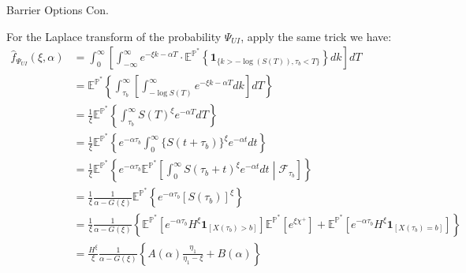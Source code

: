 \documentclass{beamer}
\begin{document}
\begin{frame}{Barrier Options Con.}

    {\footnotesize \scriptsize
    \par For the Laplace transform of the probability \(\Psi_{UI}\), apply the same trick we have: 
    \begin{align*}
        \hat{f}_{\Psi_{UI}}(\xi, \alpha) &= \int_0^\infty \left[ \int_{-\infty}^\infty e^{-\xi k - \alpha T} \cdot
         \mathbb{E}^{\mathbb{P}^*} \left\{ \mathbf{1}_{\{k > -\log(S(T)), \tau_b < T\}} \right\}  dk \right] dT\\
        &= \mathbb{E}^{\mathbb{P}^*} \left\{ \int_{\tau_b}^\infty \left[ \int_{-\log S(T)}^\infty e^{-\xi k - \alpha T}  dk \right] dT \right\}\\
        &= \frac{1}{\xi} \mathbb{E}^{\mathbb{P}^*} \left\{ \int_{\tau_b}^\infty S(T)^{\xi} e^{-\alpha T} dT \right\}\\
        &= \frac{1}{\xi} \mathbb{E}^{\mathbb{P}^*} \left\{ e^{-\alpha \tau_b} \int_0^\infty \{ S(t + \tau_b) \}^{\xi} e^{-\alpha t} dt \right\}\\
        &= \frac{1}{\xi} \mathbb{E}^{\mathbb{P}^*} \left\{ e^{-\alpha \tau_b} \mathbb{E}^{\mathbb{P}^*} \left[ \int_0^\infty S(\tau_b + t)^\xi e^{-\alpha t} 
         dt \middle| \mathcal{F}_{\tau_b} \right]\right\}\\
         & =\frac{1}{\xi} \frac{1}{\alpha - G(\xi)} \mathbb{E}^{\mathbb{P}^*} \left\{ e^{-\alpha \tau_b} [S(\tau_b)]^{\xi} \right\}\\
         & =  \frac{1}{\xi} \frac{1}{\alpha - G(\xi)} \left\{ \mathbb{E}^{\mathbb{P}^*} \left[ e^{-\alpha \tau_b} H^{\xi} \mathbf{1}_{[X(\tau_b) > b]} \right] \mathbb{E}^{\mathbb{P}^*} \left[ e^{\xi \chi^+} \right] 
         + \mathbb{E}^{\mathbb{P}^*} \left[ e^{-\alpha \tau_b} H^{\xi} \mathbf{1}_{[X(\tau_b) = b]} \right] \right\}\\
         &= \frac{H^{\xi}}{\xi} \frac{1}{\alpha - G(\xi)} \left\{ A(\alpha) \frac{\eta_1}{\eta_1 - \xi} + B(\alpha) \right\}
    \end{align*}
    }
\end{frame}
\end{document}
